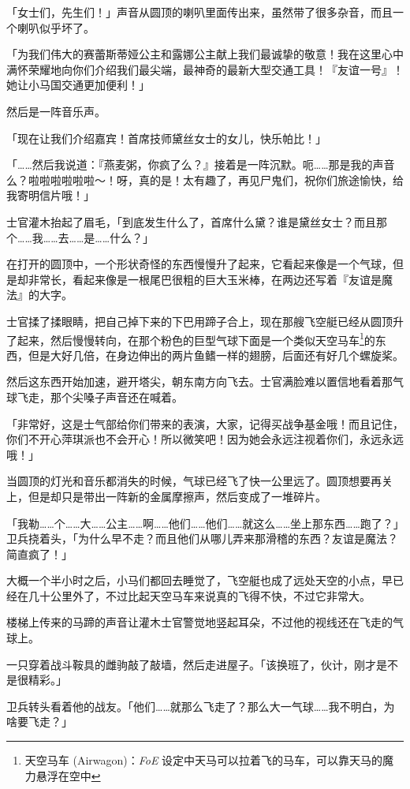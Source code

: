 「女士们，先生们！」声音从圆顶的喇叭里面传出来，虽然带了很多杂音，而且一个喇叭似乎坏了。

「为我们伟大的赛蕾斯蒂娅公主和露娜公主献上我们最诚挚的敬意！我在这里心中满怀荣耀地向你们介绍我们最尖端，最神奇的最新大型交通工具！『友谊一号』！她让小马国交通更加便利！」

然后是一阵音乐声。

「现在让我们介绍嘉宾！首席技师黛丝女士的女儿，快乐帕比！」

「……然后我说道：『燕麦粥，你疯了么？』接着是一阵沉默。呃……那是我的声音么？啦啦啦啦啦啦～！呀，真的是！太有趣了，再见尸鬼们，祝你们旅途愉快，给我寄明信片哦！」

士官灌木抬起了眉毛，「到底发生什么了，首席什么黛？谁是黛丝女士？而且那个……我……去……是……什么？」

在打开的圆顶中，一个形状奇怪的东西慢慢升了起来，它看起来像是一个气球，但是却非常长，看起来像是一根尾巴很粗的巨大玉米棒，在两边还写着『友谊是魔法』的大字。

士官揉了揉眼睛，把自己掉下来的下巴用蹄子合上，现在那艘飞空艇已经从圆顶升了起来，然后慢慢转向，在那个粉色的巨型气球下面是一个类似天空马车\footnote{天空马车 (Airwagon)：\emph{FoE} 设定中天马可以拉着飞的马车，可以靠天马的魔力悬浮在空中}的东西，但是大好几倍，在身边伸出的两片鱼鳍一样的翅膀，后面还有好几个螺旋桨。

然后这东西开始加速，避开塔尖，朝东南方向飞去。士官满脸难以置信地看着那气球飞走，那个尖嗓子声音还在喊着。

「非常好，这是士气部给你们带来的表演，大家，记得买战争基金哦！而且记住，你们不开心萍琪派也不会开心！所以微笑吧！因为她会永远注视着你们，永远永远哦！」

当圆顶的灯光和音乐都消失的时候，气球已经飞了快一公里远了。圆顶想要再关上，但是却只是带出一阵新的金属摩擦声，然后变成了一堆碎片。

「我勒……个……大……公主……啊……他们……他们……就这么……坐上那东西……跑了？」卫兵挠着头，「为什么早不走？而且他们从哪儿弄来那滑稽的东西？友谊是魔法？简直疯了！」

\horizonline

大概一个半小时之后，小马们都回去睡觉了，飞空艇也成了远处天空的小点，早已经在几十公里外了，不过比起天空马车来说真的飞得不快，不过它非常大。

楼梯上传来的马蹄的声音让灌木士官警觉地竖起耳朵，不过他的视线还在飞走的气球上。

一只穿着战斗鞍具的雌驹敲了敲墙，然后走进屋子。「该换班了，伙计，刚才是不是很精彩。」

卫兵转头看着他的战友。「他们……就那么飞走了？那么大一气球……我不明白，为啥要飞走？」

